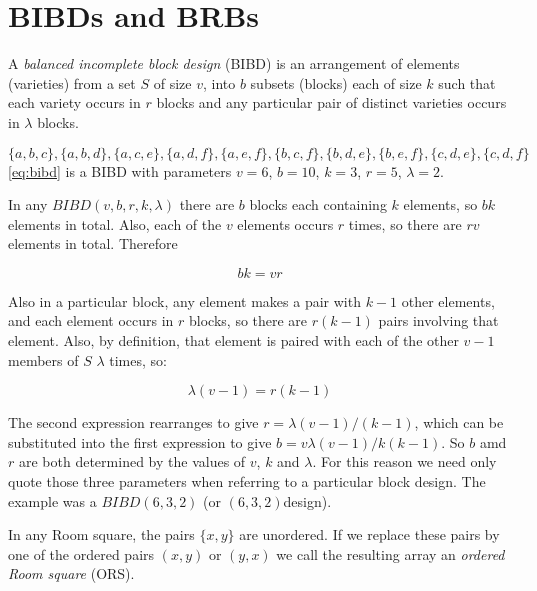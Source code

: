 \documentclass[
  11pt,
  a4paper]{book}
\newcounter{example}
\begin{document}
\hypertarget{bibds-and-brbs}{%
\section{BIBDs and BRBs}\label{bibds-and-brbs}}

A \emph{balanced incomplete block design} (BIBD) is an arrangement of
elements (varieties) from a set \(S\) of size \(v\), into \(b\) subsets
(blocks) each of size \(k\) such that each variety occurs in \(r\)
blocks and any particular pair of distinct varieties occurs in
\(\lambda\) blocks.

\begin{example}
\begin{equation}
\label{eq:bibd}
\{a,b,c\},\{a,b,d\},\{a,c,e\},\{a,d,f\},\{a,e,f\},\{b,c,f\},\{b,d,e\},\{b,e,f\},\{c,d,e\},\{c,d,f\}
\end{equation}
\eqref{eq:bibd} is a BIBD with parameters $v = 6$, $b = 10$, $k = 3$,
$r = 5$, $\lambda = 2$.
\end{example}

In any \(BIBD(v, b, r, k, \lambda)\) there are \(b\) blocks each
containing \(k\) elements, so \(bk\) elements in total. Also, each of
the \(v\) elements occurs \(r\) times, so there are \(rv\) elements in
total. Therefore

\begin{equation}
bk = vr
\end{equation}

Also in a particular block, any element makes a pair with \(k - 1\)
other elements, and each element occurs in \(r\) blocks, so there are
\(r(k - 1)\) pairs involving that element. Also, by definition, that
element is paired with each of the other \(v - 1\) members of \(S\)
\(\lambda\) times, so:

\begin{equation}
\lambda (v - 1) = r(k - 1)
\end{equation}

The second expression rearranges to give
\(r = \lambda (v - 1)/(k - 1)\), which can be substituted into the first
expression to give \(b = v\lambda (v - 1)/k(k - 1)\). So \(b\) amd \(r\)
are both determined by the values of \(v\), \(k\) and \(\lambda\). For
this reason we need only quote those three parameters when referring to
a particular block design. The example was a \(BIBD(6, 3, 2)\) (or
\((6, 3, 2)\)design).

In any Room square, the pairs \(\{x, y\}\) are unordered. If we replace
these pairs by one of the ordered pairs \((x, y)\) or \((y, x)\) we call
the resulting array an \emph{ordered Room square} (ORS).
\end{document}
